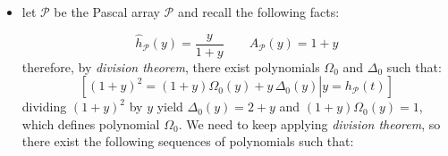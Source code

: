 \begin{itemize}

    \item let $\mathcal{P}$ be the Pascal array $\mathcal{P}$ and recall 
        the following facts:
        
        \begin{displaymath} 
            \hat{h}_{\mathcal{P}}(y)=\frac{y}{1+y} \quad\quad A_{\mathcal{P}}(y)=1+y
        \end{displaymath} 
        therefore, by \emph{division theorem}, 
        there exist polynomials $\Omega_{0}$ and $\Delta_{0}$ such that:
        \begin{displaymath}
            \left.\left[
                (1+y)^2 =  (1+y)\Omega_{0}(y) + y\,\Delta_{0}(y) \right| y = h_{\mathcal{P}}(t) \right]
        \end{displaymath}
        dividing $(1+y)^2$ by $y$ yield $\Delta_{0}(y)=2+y$ and $(1+y)\Omega_{0}(y)=1$, 
        which defines polynomial $\Omega_{0}$. We need to 
        keep applying \emph{division theorem}, so there exist the following
        sequences of polynomials such that:


\end{itemize}
